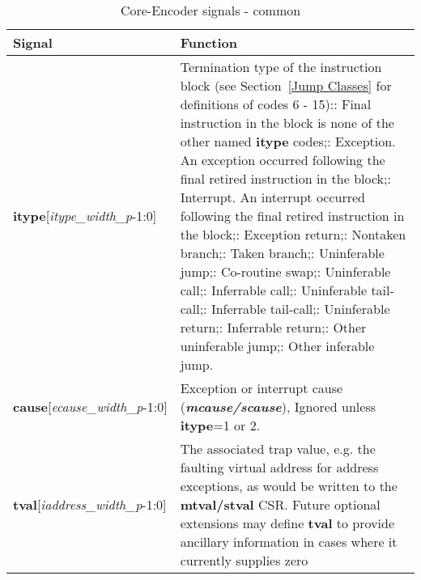 \begin{table}[htp]
    \centering
    \caption{Core-Encoder signals - common}
    \label{tab:common-ingress}
    \begin{tabulary}{\textwidth}{|l|p{80mm}|}
        \hline
        \textbf {Signal} & \textbf {Function} \\
        \hline
        \textbf{itype}[\textit{itype\_width\_p}-1:0] & Termination type of the instruction block (see Section~\ref{Jump Classes} for definitions of codes 6 - 15):: Final instruction in the block is none of the other named \textbf{itype} codes;: Exception. An exception occurred following the final retired instruction in the block;: Interrupt. An interrupt occurred following the final retired instruction in the block;: Exception return;: Nontaken branch;: Taken branch;: Uninferable jump;: Co-routine swap;: Uninferable call;: Inferrable call;: Uninferable tail-call;: Inferrable tail-call;: Uninferable return;: Inferrable return;: Other uninferable jump;: Other inferable jump.\\
        \hline
        \textbf{cause}[\textit{ecause\_width\_p}-1:0] & Exception or interrupt cause (\textbf{\textit{mcause/scause}}), \newline
        Ignored unless \textbf {itype}=1 or 2.\\
        \hline
        \textbf{tval}[\textit{iaddress\_width\_p}-1:0]& The associated trap value, e.g. the
    faulting virtual address for address exceptions, as would be
    written to the \textbf{mtval/stval} CSR. Future optional extensions may define \textbf{tval} to provide ancillary information in cases where it currently supplies zero\newline

\end{tabulary}
\end{table}
